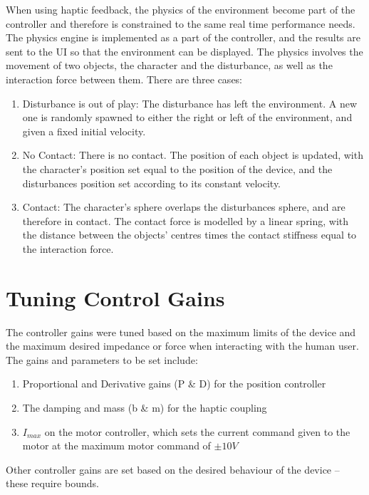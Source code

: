 \documentclass[12pt]{report}
\begin{document}
When using haptic feedback, the physics of the environment become part of the controller and therefore is constrained to the same real time performance needs. The physics engine is implemented as a part of the controller, and the results are sent to the UI so that the environment can be displayed. The physics involves the movement of two objects, the character and the disturbance, as well as the interaction force between them. There are three cases:

\begin{enumerate}
	\item Disturbance is out of play: The disturbance has left the environment. A new one is randomly spawned to either the right or left of the environment, and given a fixed initial velocity.
	\item No Contact: There is no contact. The position of each object is updated, with the character's position set equal to the position of the device, and the disturbances position set according to its constant velocity. 
	\item Contact: The character's sphere overlaps the disturbances sphere, and are therefore in contact. The contact force is modelled by a linear spring, with the distance between the objects' centres times the contact stiffness equal to the interaction force. 
\end{enumerate}

	
	\section{Tuning Control Gains}

	The controller gains were tuned based on the maximum limits of the device and the maximum desired impedance or force when interacting with the human user. The gains and parameters to be set include:
	
	\begin{enumerate}
		\item Proportional and Derivative gains (P \& D) for the position controller 
		\item The damping and mass (b \& m) for the haptic coupling 
		\item $I_{max}$ on the motor controller, which sets the current command given to the motor at the maximum motor command of $\pm 10V$
	\end{enumerate}		
	
	Other controller gains are set based on the desired behaviour of the device -- these require bounds. 
	
\end{document}
